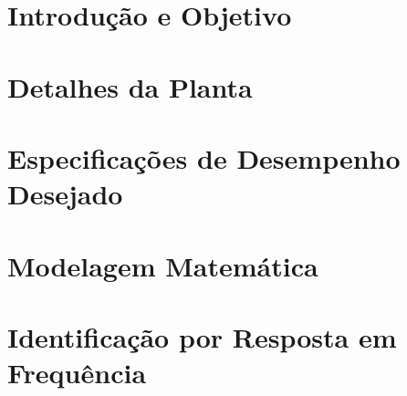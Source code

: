 \documentclass[conference,harvard,brazil,english]{sbatex}
\begin{document}


\section{Introdução e Objetivo}


\section{Detalhes da Planta}



\section{Especificações de Desempenho Desejado}


\section{Modelagem Matemática}


\section{Identificação por Resposta em Frequência} 


\nocite{*}

\cite{mozelli2020}
\cite{oliveira2011}
\cite{parks1999}
\end{document}
